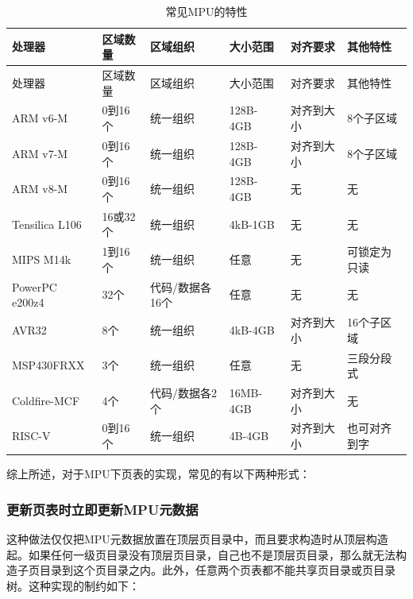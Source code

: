 \begin{xltabular}{\textwidth}{@{}>{\hsize\raggedright\arraybackslash}X>{\hsize\raggedright\arraybackslash}X>{\hsize\raggedright\arraybackslash}X>{\hsize\raggedright\arraybackslash}X>{\hsize\raggedright\arraybackslash}X>{\hsize\raggedright\arraybackslash}X@{}}
\caption{常见MPU的特性}\label{tab:3-5-common-mpu-features}\\
\toprule
处理器 & 区域数量 & 区域组织 & 大小范围 & 对齐要求 &
其他特性\tabularnewline
\endfirsthead
\toprule
处理器 & 区域数量 & 区域组织 & 大小范围 & 对齐要求 &
其他特性\tabularnewline
\midrule
\endhead
\bottomrule
\endlastfoot
ARM v6-M & 0到16个 & 统一组织 & 128B-4GB & 对齐到大小 &
8个子区域\tabularnewline
ARM v7-M & 0到16个 & 统一组织 & 128B-4GB & 对齐到大小 &
8个子区域\tabularnewline
ARM v8-M & 0到16个 & 统一组织 & 128B-4GB & 无 & 无\tabularnewline
Tensilica L106 & 16或32个 & 统一组织 & 4kB-1GB & 无 & 无\tabularnewline
MIPS M14k & 1到16个 & 统一组织 & 任意 & 无 & 可锁定为只读\tabularnewline
PowerPC e200z4 & 32个 & 代码/数据各16个 & 任意 & 无 & 无\tabularnewline
AVR32 & 8个 & 统一组织 & 4kB-4GB & 对齐到大小 &
16个子区域\tabularnewline
MSP430FRXX & 3个 & 统一组织 & 任意 & 无 & 三段分段式\tabularnewline
Coldfire-MCF & 4个 & 代码/数据各2个 & 16MB-4GB & 对齐到大小 &
无\tabularnewline
RISC-V & 0到16个 & 统一组织 & 4B-4GB & 对齐到大小 &
也可对齐到字\tabularnewline
\end{xltabular}

综上所述，对于MPU下页表的实现，常见的有以下两种形式：

\subsubsection{更新页表时立即更新MPU元数据}\label{subsubsec:3-update-mpu-metadata-immediately}

这种做法仅仅把MPU元数据放置在顶层页目录中，而且要求构造时从顶层构造起。如果任何一级页目录没有顶层页目录，自己也不是顶层页目录，那么就无法构造子页目录到这个页目录之内。此外，任意两个页表都不能共享页目录或页目录树。这种实现的制约如下：


